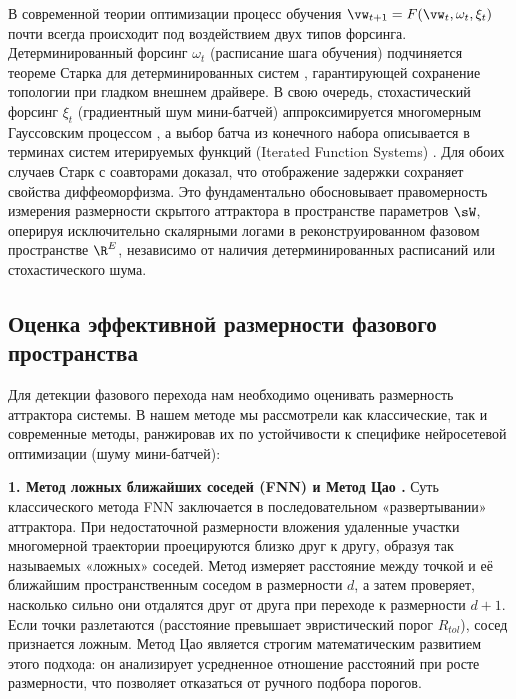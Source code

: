 \documentclass{article}
\begin{document}
В современной теории оптимизации процесс обучения $\vw_{t+1} = F(\vw_t, \omega_t, \xi_t)$ почти всегда происходит под воздействием двух типов форсинга. Детерминированный форсинг $\omega_t$ (расписание шага обучения) подчиняется теореме Старка для детерминированных систем \cite{stark1999delay}, гарантирующей сохранение топологии при гладком внешнем драйвере. В свою очередь, стохастический форсинг $\xi_t$ (градиентный шум мини-батчей) аппроксимируется многомерным Гауссовским процессом \cite{mandt2017stochastic}, а выбор батча из конечного набора описывается в терминах систем итерируемых функций (Iterated Function Systems) \cite{stark2003delay}. Для обоих случаев Старк с соавторами доказал, что отображение задержки сохраняет свойства диффеоморфизма. Это фундаментально обосновывает правомерность измерения размерности скрытого аттрактора в пространстве параметров $\sW$, оперируя исключительно скалярными логами в реконструированном фазовом пространстве $\R^E$, независимо от наличия детерминированных расписаний или стохастического шума.

\subsection{Оценка эффективной размерности фазового пространства}\label{sec:theory_dim}

Для детекции фазового перехода нам необходимо оценивать размерность аттрактора системы. В нашем методе мы рассмотрели как классические, так и современные методы, ранжировав их по устойчивости к специфике нейросетевой оптимизации (шуму мини-батчей):

\textbf{1. Метод ложных ближайших соседей (FNN) \cite{kennel1992determining} и Метод Цао \cite{cao1997practical}.} 
Суть классического метода FNN заключается в последовательном «развертывании» аттрактора. При недостаточной размерности вложения удаленные участки многомерной траектории проецируются близко друг к другу, образуя так называемых «ложных» соседей. Метод измеряет расстояние между точкой и её ближайшим пространственным соседом в размерности $d$, а затем проверяет, насколько сильно они отдалятся друг от друга при переходе к размерности $d+1$. Если точки разлетаются (расстояние превышает эвристический порог $R_{tol}$), сосед признается ложным. Метод Цао является строгим математическим развитием этого подхода: он анализирует усредненное отношение расстояний при росте размерности, что позволяет отказаться от ручного подбора порогов.
\end{document}
